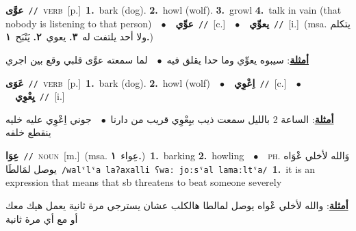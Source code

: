 \documentclass[10pt,a4paper,twoside]{article} %
\begin{document}
\begin{multicols}{2}
{\setlength\topsep{0pt}\textbf{\foreignlanguage{arabic}{عوَّى}}\ {\color{gray}\texttt{//}\color{black}}\ \textsc{verb}\ [p.]\ \textbf{1.}~bark (dog).  \textbf{2.}~howl (wolf).  \textbf{3.}~growl  \textbf{4.}~talk in vain (that nobody is listening to that person)\ \ $\bullet$\ \ \setlength\topsep{0pt}\textbf{\foreignlanguage{arabic}{عوِّي}}\ {\color{gray}\texttt{//}\color{black}}\ [c.]\ \ $\bullet$\ \ \setlength\topsep{0pt}\textbf{\foreignlanguage{arabic}{يعوِّي}}\ {\color{gray}\texttt{//}\color{black}}\ [i.]\ \color{gray}(msa. \foreignlanguage{arabic}{يتكلم ولا أحد يلتفت له}~\foreignlanguage{arabic}{\textbf{٣.}}  \foreignlanguage{arabic}{يعوي}~\foreignlanguage{arabic}{\textbf{٢.}}  \foreignlanguage{arabic}{يَنْبَح}~\foreignlanguage{arabic}{\textbf{١.}})\color{black}\  \begin{flushright}\color{gray}\foreignlanguage{arabic}{\textbf{\underline{\foreignlanguage{arabic}{أمثلة}}}: سيبوه يعوِّي وما حدا يقلق فيه\ $\bullet$\ \  لما سمعته عوَّى قلبي وقع بين اجري}\end{flushright}\color{black}} \vspace{2mm}

{\setlength\topsep{0pt}\textbf{\foreignlanguage{arabic}{عَوَى}}\ {\color{gray}\texttt{//}\color{black}}\ \textsc{verb}\ [p.]\ \textbf{1.}~bark (dog).  \textbf{2.}~howl (wolf)\ \ $\bullet$\ \ \setlength\topsep{0pt}\textbf{\foreignlanguage{arabic}{اِعْوِي}}\ {\color{gray}\texttt{//}\color{black}}\ [c.]\ \ $\bullet$\ \ \setlength\topsep{0pt}\textbf{\foreignlanguage{arabic}{يِعْوِي}}\ {\color{gray}\texttt{//}\color{black}}\ [i.]\  \begin{flushright}\color{gray}\foreignlanguage{arabic}{\textbf{\underline{\foreignlanguage{arabic}{أمثلة}}}: الساعة 2 بالليل سمعت ذيب بيِعْوِي قريب من دارنا\ $\bullet$\ \  جوني اِعْوِي عليه خليه ينقطع خلفه}\end{flushright}\color{black}} \vspace{2mm}

{\setlength\topsep{0pt}\textbf{\foreignlanguage{arabic}{عِوَا}}\ {\color{gray}\texttt{//}\color{black}}\ \textsc{noun}\ [m.]\ \color{gray}(msa. \foreignlanguage{arabic}{عِواء}~\foreignlanguage{arabic}{\textbf{١.}})\color{black}\ \textbf{1.}~barking  \textbf{2.}~howling\ \ $\bullet$\ \ \textsc{ph.} \color{gray} \foreignlanguage{arabic}{وَالله لأخلي عْوَاه يوصل لمَالطَا}\color{black}\ {\color{gray}\texttt{/{\sffamily walˤlˤa laʔaxalli ʕwaː joːsˤal lamaːltˤa}/}\color{black}}\ \textbf{1.}~it is an expression that means that sb threatens to beat someone severely\  \begin{flushright}\color{gray}\foreignlanguage{arabic}{\textbf{\underline{\foreignlanguage{arabic}{أمثلة}}}: والله لأخلي عْواه يوصل لمالطا هالكلب عشان يسترجي مرة ثانية يعمل هيك معك أو مع أي مرة ثانية}\end{flushright}\color{black}} \vspace{2mm}


\end{multicols}
\end{document}
